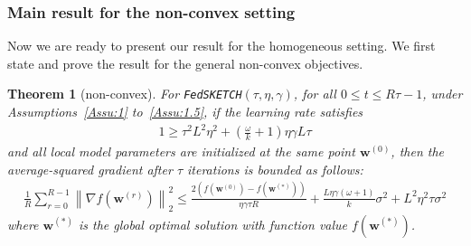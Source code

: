 \documentclass{article}
\newtheorem{theorem}{Theorem}
\begin{document}
\subsubsection{Main result for the non-convex setting}
Now we are ready to present our result for the homogeneous setting. We first state and prove the result for the general non-convex objectives.  
\begin{theorem}[non-convex]\label{thm:lsgwd-lr} For \texttt{FedSKETCH}$(\tau, \eta, \gamma)$, for all $0\leq t\leq R\tau-1$,  under Assumptions~\ref{Assu:1} to~\ref{Assu:1.5}, if the learning rate satisfies \begin{align}
   1\geq {\tau^2 L^2\eta^2}+\left(\frac{\omega}{k}+1\right){\eta\gamma L}{\tau}
\label{eq:cnd-thm4.3}
\end{align}
and all local model parameters are initialized at the same point ${\boldsymbol{w}}^{(0)}$, then the average-squared gradient after $\tau$ iterations is bounded as follows:
\begin{align}
        \frac{1}{R}\sum_{r=0}^{R-1}\left\|\nabla f({\boldsymbol{w}}^{(r)})\right\|_2^2\leq \frac{2\left(f(\boldsymbol{w}^{(0)})-f(\boldsymbol{w}^{(*)})\right)}{\eta\gamma\tau R}+\frac{L\eta\gamma{\left(\omega+1\right)}}{k}\sigma^2+{L^2\eta^2\tau }\sigma^2\label{eq:thm1-result} 
\end{align}
where $\boldsymbol{w}^{(*)}$ is the global optimal solution with  function value $f(\boldsymbol{w}^{(*)})$.
\end{theorem}
\end{document}
